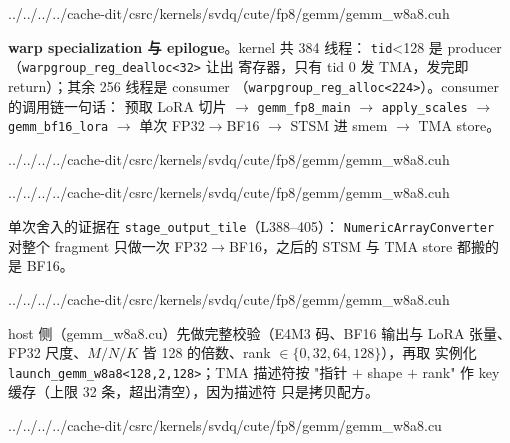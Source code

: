 \begin{lstinputlisting}[linerange={343-378},firstnumber=auto,
  title={gemm\_w8a8.cuh L343--378（gemm\_bf16\_lora：rank 切片累加与 rank 128 的按需 refill）}]{../../../../cache-dit/csrc/kernels/svdq/cute/fp8/gemm/gemm_w8a8.cuh}
\end{lstinputlisting}

\textbf{warp specialization 与 epilogue}。kernel 共 384 线程：
\texttt{tid}<128 是 producer（\texttt{warpgroup\_reg\_dealloc<32>} 让出
寄存器，只有 tid 0 发 TMA，发完即 return）；其余 256 线程是 consumer
（\texttt{warpgroup\_reg\_alloc<224>}）。consumer 的调用链一句话：
预取 LoRA 切片 $\to$ \texttt{gemm\_fp8\_main} $\to$ \texttt{apply\_scales}
$\to$ \texttt{gemm\_bf16\_lora} $\to$ 单次 FP32$\to$BF16 $\to$ STSM 进
smem $\to$ TMA store。

\begin{lstinputlisting}[linerange={507-518},firstnumber=auto,
  title={gemm\_w8a8.cuh L507--518（producer 分派：reg\_dealloc 与 TMA 发射环）}]{../../../../cache-dit/csrc/kernels/svdq/cute/fp8/gemm/gemm_w8a8.cuh}
\end{lstinputlisting}

\begin{lstinputlisting}[linerange={520-545},firstnumber=auto,
  title={gemm\_w8a8.cuh L520--545（consumer 调用链：LoRA 预取到 TMA store 的五步）}]{../../../../cache-dit/csrc/kernels/svdq/cute/fp8/gemm/gemm_w8a8.cuh}
\end{lstinputlisting}

单次舍入的证据在 \texttt{stage\_output\_tile}（L388--405）：
\texttt{NumericArrayConverter} 对整个 fragment 只做一次
FP32$\to$BF16，之后的 STSM 与 TMA store 都搬的是 BF16。

\begin{lstinputlisting}[linerange={388-405},firstnumber=auto,
  title={gemm\_w8a8.cuh L388--405（stage\_output\_tile：全 kernel 唯一一次 FP32 到 BF16 转换）}]{../../../../cache-dit/csrc/kernels/svdq/cute/fp8/gemm/gemm_w8a8.cuh}
\end{lstinputlisting}

host 侧（gemm\_w8a8.cu）先做完整校验（E4M3 码、BF16 输出与 LoRA 张量、
FP32 尺度、$M/N/K$ 皆 128 的倍数、rank $\in\{0,32,64,128\}$），再取
实例化 \texttt{launch\_gemm\_w8a8<128,2,128>}；TMA 描述符按
"指针 $+$ shape $+$ rank" 作 key 缓存（上限 32 条，超出清空），因为描述符
只是拷贝配方。

\begin{lstinputlisting}[linerange={59-83},firstnumber=auto,
  title={gemm\_w8a8.cu L59--83（host 几何约束与 $<$128,2,128$>$ 实例化）}]{../../../../cache-dit/csrc/kernels/svdq/cute/fp8/gemm/gemm_w8a8.cu}
\end{lstinputlisting}

